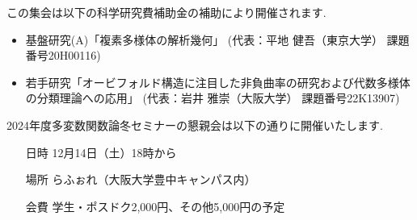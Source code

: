 \documentclass[dvipdfmx,a4paper,12pt]{article}
\theoremstyle{plain} %
\theoremstyle{definition} %
\begin{document}

  
  

この集会は以下の科学研究費補助金の補助により開催されます.
\begin{itemize}
  \setlength{\parskip}{0cm} 
  \setlength{\itemsep}{0cm}
\item 基盤研究(A)「複素多様体の解析幾何」 
(代表：平地 健吾（東京大学） 課題番号20H00116)
\item 若手研究「オービフォルド構造に注目した非負曲率の研究および代数多様体の分類理論への応用」
 (代表：岩井 雅崇（大阪大学） 課題番号22K13907)
  \end{itemize}

\vskip5mm

2024年度多変数関数論冬セミナーの懇親会は以下の通りに開催いたします.
\begin{itemize}
  \setlength{\parskip}{0cm} 
  \setlength{\itemsep}{0cm}
\item[日時] 12月14日（土）18時から
\item[場所] らふぉれ（大阪大学豊中キャンパス内）
\item[会費] 学生・ポスドク2,000円、その他5,000円の予定
  \end{itemize}
\end{document}
